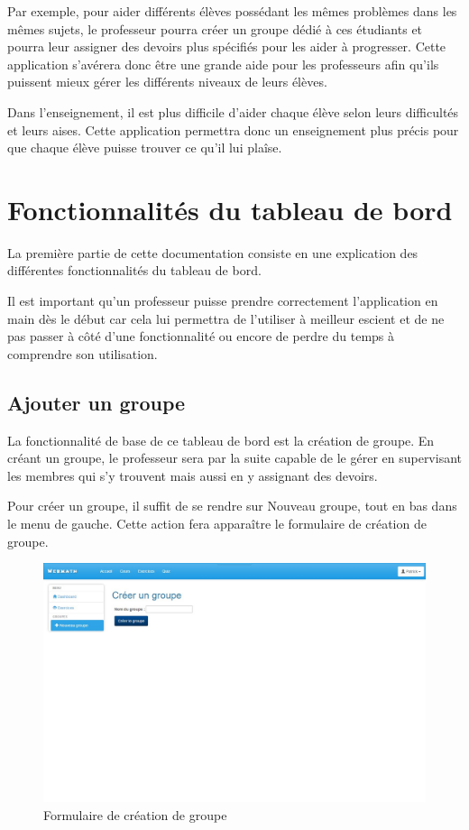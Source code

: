\documentclass[a4paper,10pt,french]{sphinxmanual}
\begin{document}
Par exemple, pour aider différents élèves possédant les mêmes problèmes dans les
mêmes sujets, le professeur pourra créer un groupe dédié à ces étudiants et
pourra leur assigner des devoirs plus spécifiés pour les aider à progresser.
Cette application s'avérera donc être une grande aide pour les professeurs afin
qu'ils puissent mieux gérer les différents niveaux de leurs élèves.

Dans l'enseignement, il est plus difficile d'aider chaque élève selon leurs
difficultés et leurs aises. Cette application permettra donc un enseignement
plus précis pour que chaque élève puisse trouver ce qu'il lui plaîse.


\chapter{Fonctionnalités du tableau de bord}
\label{dashboard::doc}\label{dashboard:fonctionnalites-du-tableau-de-bord}
La première partie de cette documentation consiste en une explication des
différentes fonctionnalités du tableau de bord.

Il est important qu'un professeur puisse prendre correctement l'application en
main dès le début car cela lui permettra de l'utiliser à meilleur escient
et de ne pas passer à côté d'une fonctionnalité ou encore de perdre du temps
à comprendre son utilisation.


\section{Ajouter un groupe}
\label{dashboard:ajouter-un-groupe}
La fonctionnalité de base de ce tableau de bord est la création de groupe. En
créant un groupe, le professeur sera par la suite capable de le gérer en
supervisant les membres qui s'y trouvent mais aussi en y assignant des devoirs.

Pour créer un groupe, il suffit de se rendre sur Nouveau groupe, tout en bas
dans le menu de gauche. Cette action fera apparaître le formulaire de création
de groupe.
\begin{figure}[htbp]
\centering
\capstart

\includegraphics[width=0.500\linewidth]{Newclass.jpg}
\caption{Formulaire de création de groupe}\end{figure}
\end{document}
